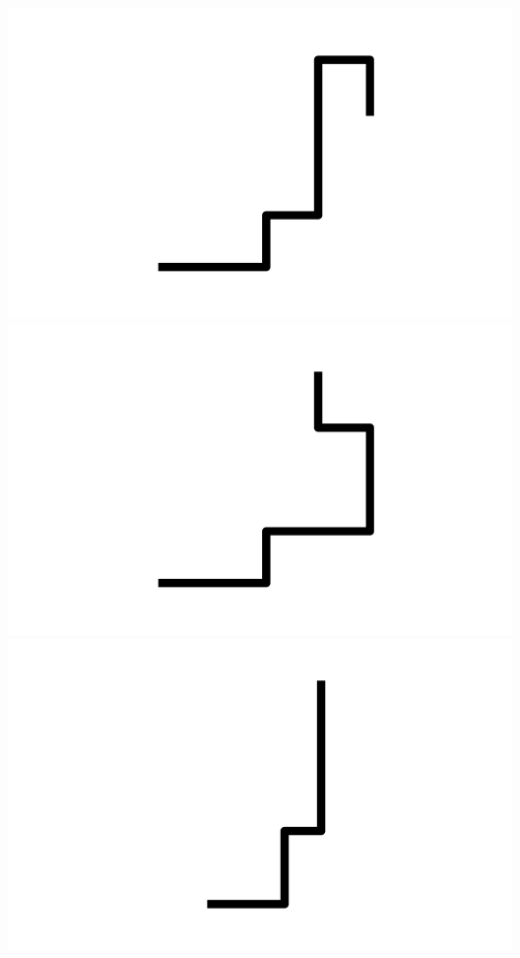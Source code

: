 \documentclass[]{report}
\begin{document}
\includegraphics[scale=.1]{pictures/21/state_cluster_shapes_403.pdf} 
\includegraphics[scale=.1]{pictures/21/state_cluster_shapes_404.pdf} 
\includegraphics[scale=.1]{pictures/21/state_cluster_shapes_405.pdf} 
\end{document}
